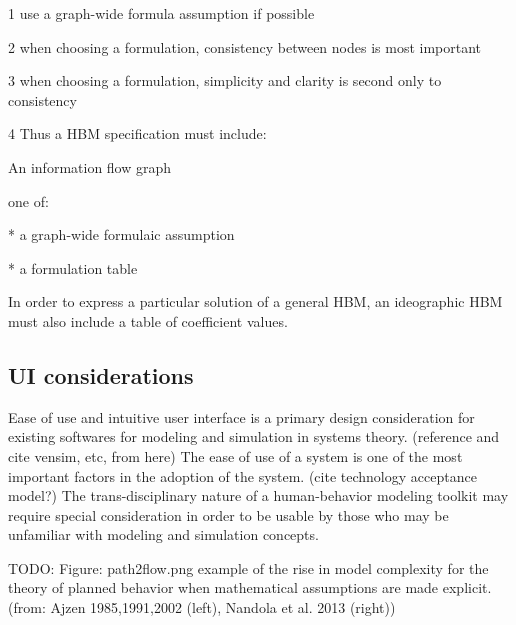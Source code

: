 
1 use a graph-wide formula assumption if possible

2 when choosing a formulation, consistency between nodes is most important

3 when choosing a formulation, simplicity and clarity is second only to consistency

4 Thus a HBM specification must include:

   An information flow graph

   one of:

* a graph-wide formulaic assumption

* a formulation table 

In order to express a particular solution of a general HBM, an ideographic HBM must also include a table of coefficient values. 


\subsection{UI considerations}
Ease of use and intuitive user interface is a primary design consideration for existing softwares for modeling and simulation in systems theory. (reference and cite vensim, etc, from here) 
The ease of use of a system is one of the most important factors in the adoption of the system. (cite technology acceptance model?) 
The trans-disciplinary nature of a human-behavior modeling toolkit may require special consideration in order to be usable by those who may be unfamiliar with modeling and simulation concepts.

TODO: Figure: path2flow.png example of the rise in model complexity for the theory of planned behavior when mathematical assumptions are made explicit. (from: Ajzen 1985,1991,2002 (left), Nandola et al. 2013 (right))
